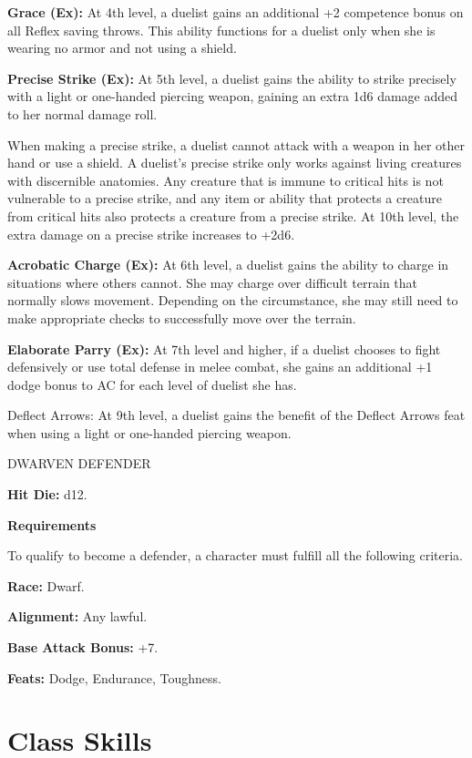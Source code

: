\documentclass{article}
\begin{document}
\textbf{Grace (Ex):} At 4th level, a duelist gains an additional +2 competence 
bonus on all Reflex saving throws. This ability functions for a duelist only when 
she is wearing no armor and not using a shield.

\textbf{Precise Strike (Ex):} At 5th level, a duelist gains the ability to strike 
precisely with a light or one-handed piercing weapon, gaining an extra 1d6 damage 
added to her normal damage roll.

When making a precise strike, a duelist cannot attack with a weapon in her other 
hand or use a shield. A duelist's precise strike only works against living creatures 
with discernible anatomies. Any creature that is immune to critical hits is not 
vulnerable to a precise strike, and any item or ability that protects a creature 
from critical hits\textit{ }also protects a creature from a precise strike. At 
10th level, the extra damage on a precise strike increases to +2d6.

\textbf{Acrobatic Charge (Ex):} At 6th level, a duelist gains the ability to charge 
in situations where others cannot. She may charge over difficult terrain that normally 
slows movement. Depending on the circumstance, she may still need to make appropriate 
checks to successfully move over the terrain.

\textbf{Elaborate Parry (Ex):} At 7th level and higher, if a duelist chooses to 
fight defensively or use total defense in melee combat, she gains an additional 
+1 dodge bonus to AC for each level of duelist she has.

Deflect Arrows: At 9th level, a duelist gains the benefit of the Deflect Arrows 
feat when using a light or one-handed piercing weapon.

\vspace{12pt}
DWARVEN DEFENDER

\textbf{Hit Die:} d12.

\textbf{Requirements}

To qualify to become a defender, a character must fulfill all the following criteria.

\textbf{Race:} Dwarf.

\textbf{Alignment:} Any lawful.

\textbf{Base Attack Bonus:} +7.

\textbf{Feats:} Dodge, Endurance, Toughness.

\section*{\textbf{Class Skills}}
\end{document}
